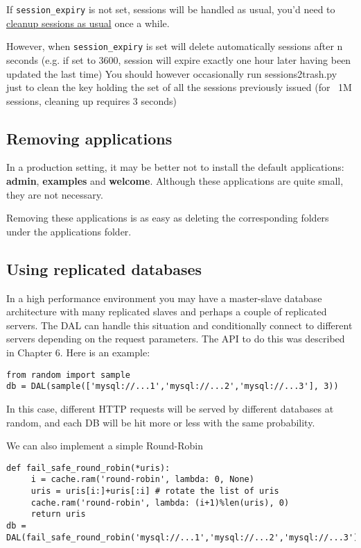 \documentclass[justified,sixbynine,notoc]{tufte-book}
\def\ft{\small\tt}
\def\inxx#1{\index{#1}}
\begin{document}
\begin{fullwidth}
If {\ft session\_expiry} is not set, sessions will be handled as usual, you'd need to {\footnotesize\href{@///chapter/13\#Cleaning-up-sessions}{cleanup sessions as usual}} once a while.

However, when {\ft session\_expiry} is set will delete automatically sessions after n seconds
(e.g. if set to 3600, session will expire exactly one hour later having been updated the last time)
You should however occasionally run sessions2trash.py just to clean the key holding the set of all
the sessions previously issued (for ~1M sessions, cleaning up requires 3 seconds)

\goodbreak\subsection{Removing applications}

\inxx{removing application}

In a production setting, it may be better not to install the default applications: {\bf admin}, {\bf examples} and {\bf welcome}. Although these applications are quite small, they are not necessary.

Removing these applications is as easy as deleting the corresponding folders under the applications folder.

\goodbreak\subsection{Using replicated databases}

In a high performance environment you may have a master-slave database
architecture with many replicated slaves and perhaps a couple of
replicated servers. The DAL can handle this situation and conditionally
connect to different servers depending on the request parameters. The
API to do this was described in Chapter 6. Here is an example:

\begin{lstlisting}
from random import sample
db = DAL(sample(['mysql://...1','mysql://...2','mysql://...3'], 3))
\end{lstlisting}

In this case, different HTTP requests will be served by different
databases at random, and each DB will be hit more or less with the
same probability.

We can also implement a simple Round-Robin

\begin{lstlisting}
def fail_safe_round_robin(*uris):
     i = cache.ram('round-robin', lambda: 0, None)
     uris = uris[i:]+uris[:i] # rotate the list of uris
     cache.ram('round-robin', lambda: (i+1)%len(uris), 0)
     return uris
db = DAL(fail_safe_round_robin('mysql://...1','mysql://...2','mysql://...3'))
\end{lstlisting}


\end{fullwidth}
\end{document}
